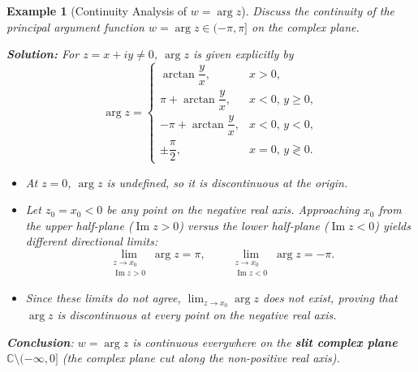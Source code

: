 \documentclass[11pt,a4paper]{article}
\renewcommand{\Im}{\operatorname{Im}}
\theoremstyle{breakdef}
\newtheorem{example}{Example}
\theoremstyle{breakthm}
\begin{document}
\begin{example}[Continuity Analysis of $w = \arg z$]
Discuss the continuity of the principal argument function $w = \arg z \in (-\pi, \pi]$ on the complex plane.

\textbf{Solution:} For $z = x + iy \neq 0$, $\arg z$ is given explicitly by
\[
    \arg z = \begin{cases}
        \arctan\dfrac{y}{x}, & x > 0, \\[0.9em]
        \pi + \arctan\dfrac{y}{x}, & x < 0, \, y \ge 0, \\[0.9em]
        -\pi + \arctan\dfrac{y}{x}, & x < 0, \, y < 0, \\[0.9em]
        \pm\dfrac{\pi}{2}, & x = 0, \, y \gtrless 0.
    \end{cases}
\]
\begin{itemize}
    \item At $z = 0$, $\arg z$ is undefined, so it is discontinuous at the origin.
    \item Let $z_0 = x_0 < 0$ be any point on the negative real axis. Approaching $x_0$ from the upper half-plane ($\Im z > 0$) versus the lower half-plane ($\Im z < 0$) yields different directional limits:
    \[
        \lim_{\substack{z \to x_0 \\ \Im z > 0}} \arg z = \pi, \qquad \lim_{\substack{z \to x_0 \\ \Im z < 0}} \arg z = -\pi.
    \]
    \item Since these limits do not agree, $\lim_{z \to x_0} \arg z$ does not exist, proving that $\arg z$ is discontinuous at every point on the negative real axis.
\end{itemize}
\textbf{Conclusion}: $w = \arg z$ is continuous everywhere on the \textbf{slit complex plane} $\mathbb{C} \setminus (-\infty, 0]$ (the complex plane cut along the non-positive real axis).
\end{example}
\end{document}
